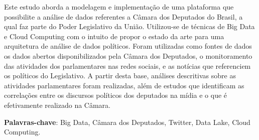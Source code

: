 \setlength{\absparsep}{18pt} %
\begin{resumo}
        Este estudo aborda a modelagem e implementação de uma plataforma que possibilite a análise de dados referentes a Câmara dos Deputados do Brasil, a qual faz parte do Poder Legislativo da União. Utilizou-se de técnicas de Big Data e Cloud Computing com o intuito de propor o estado da arte para uma arquitetura de análise de dados políticos. Foram utilizadas como fontes de dados os dados abertos disponibilizados pela Câmara dos Deputados, o monitoramento das atividades dos parlamentares nas redes sociais, e as notícias que referenciem os políticos do Legislativo. A partir desta base, análises descritivas sobre as atividades parlamentares foram realizadas, além de estudos que identificam as correlações entre os discursos políticos dos deputados na mídia e o que é efetivamente realizado na Câmara.
        
    
    \textbf{Palavras-chave}: Big Data, Câmara dos Deputados, Twitter, Data Lake, Cloud Computing.
\end{resumo}

